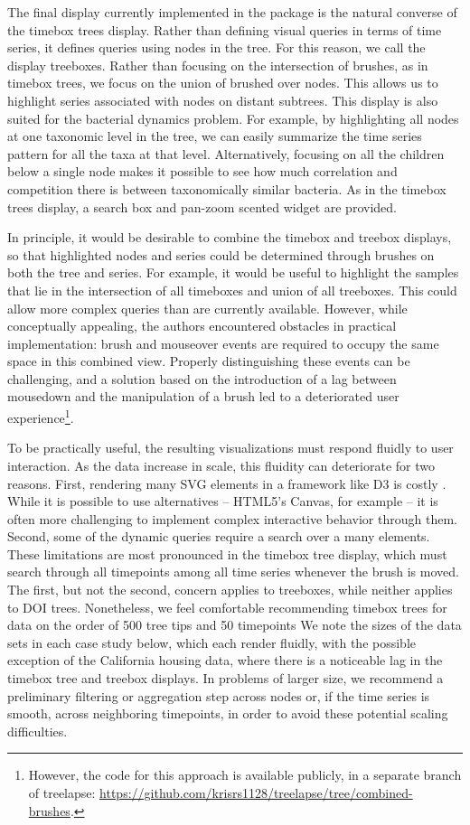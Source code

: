 The final display currently implemented in the package is the natural converse
of the timebox trees display. Rather than defining visual queries in terms of
time series, it defines queries using nodes in the tree. For this reason, we
call the display treeboxes. Rather than focusing on the intersection of brushes,
as in timebox trees, we focus on the union of brushed over nodes. This allows us
to highlight series associated with nodes on distant subtrees. This display is
also suited for the bacterial dynamics problem. For example, by highlighting all
nodes at one taxonomic level in the tree, we can easily summarize the time
series pattern for all the taxa at that level. Alternatively, focusing on all
the children below a single node makes it possible to see how much correlation
and competition there is between taxonomically similar bacteria. As in the
timebox trees display, a search box and pan-zoom scented widget are provided.

In principle, it would be desirable to combine the timebox and treebox displays,
so that highlighted nodes and series could be determined through brushes on both
the tree and series. For example, it would be useful to highlight the samples
that lie in the intersection of all timeboxes and union of all treeboxes. This
could allow more complex queries than are currently available. However, while
conceptually appealing, the authors encountered obstacles in practical
implementation: brush and mouseover events are required to occupy the same space
in this combined view. Properly distinguishing these events can be challenging,
and a solution based on the introduction of a lag between mousedown and the
manipulation of a brush led to a deteriorated user experience\footnote{However,
  the code for this approach is available publicly, in a separate branch of
  treelapse:
  \url{https://github.com/krisrs1128/treelapse/tree/combined-brushes}.}.

To be practically useful, the resulting visualizations must respond fluidly to
user interaction. As the data increase in scale, this fluidity can deteriorate
for two reasons. First, rendering many SVG elements in a framework like D3 is
costly \citep{johnson2008scalability}. While it is possible to use alternatives
-- HTML5's Canvas, for example -- it is often more challenging to implement
complex interactive behavior through them. Second, some of the dynamic queries
require a search over a many elements. These limitations are most pronounced in
the timebox tree display, which must search through all timepoints among all
time series whenever the brush is moved. The first, but not the second, concern
applies to treeboxes, while neither applies to DOI trees. Nonetheless, we feel
comfortable recommending timebox trees for data on the order of 500 tree tips
and 50 timepoints We note the sizes of the data sets in each case study below,
which each render fluidly, with the possible exception of the California housing
data, where there is a noticeable lag in the timebox tree and treebox displays.
In problems of larger size, we recommend a preliminary filtering or aggregation
step across nodes or, if the time series is smooth, across neighboring
timepoints, in order to avoid these potential scaling difficulties.

